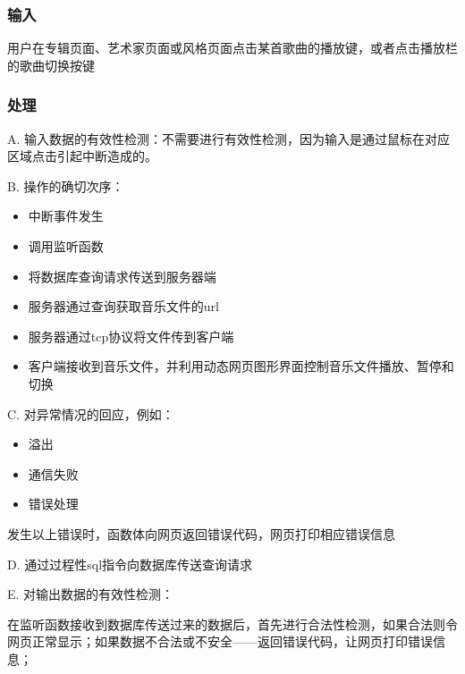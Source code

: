 		 \subsubsection{输入}
		 
		 用户在专辑页面、艺术家页面或风格页面点击某首歌曲的播放键，或者点击播放栏的歌曲切换按键
	  
	  
		 \subsubsection{处理}
		 
		 
		 
		 A. 输入数据的有效性检测：不需要进行有效性检测，因为输入是通过鼠标在对应区域点击引起中断造成的。
		 
		 B. 操作的确切次序：
		 \begin{adjustwidth}{2cm}{1cm}\qquad
			 \begin{itemize}
				 \item 中断事件发生
				 \item 调用监听函数
				 \item 将数据库查询请求传送到服务器端
				 \item 服务器通过查询获取音乐文件的url
				 \item 服务器通过tcp协议将文件传到客户端
				 \item 客户端接收到音乐文件，并利用动态网页图形界面控制音乐文件播放、暂停和切换
			 \end{itemize}		
		 \end{adjustwidth}
		  
		 
		 C. 对异常情况的回应，例如：
		 \begin{adjustwidth}{2cm}{1cm}\qquad
			 \begin{itemize}
				 \item 溢出
				 \item 通信失败
				 \item 错误处理
			 \end{itemize}		
		 \end{adjustwidth}
		 
			 发生以上错误时，函数体向网页返回错误代码，网页打印相应错误信息
		 
D. 通过过程性sql指令向数据库传送查询请求
				 
		 E. 对输出数据的有效性检测：
		 
		 在监听函数接收到数据库传送过来的数据后，首先进行合法性检测，如果合法则令网页正常显示；如果数据不合法或不安全——返回错误代码，让网页打印错误信息；
		 
